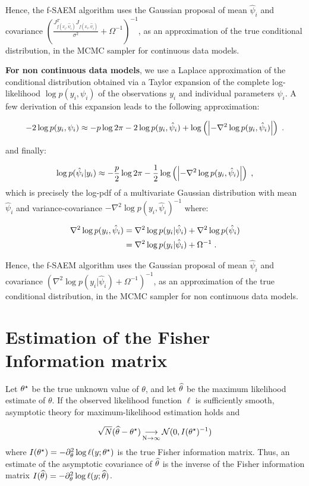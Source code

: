 Hence, the f-SAEM algorithm uses the Gaussian proposal of mean $\hat{\psi}_i$ and covariance $\left(\frac{ J_{f(x_{i},\hat{\psi}_i)}^T J_{f(x_{i},\hat{\psi}_i)} }{\sigma^2} + \Omega^{-1}\right)^{-1}$, as an approximation of the true conditional distribution, in the MCMC sampler for continuous data models.


\textbf{For non continuous data models}, we use a Laplace approximation of the conditional distribution obtained via a Taylor expansion of the complete log-likelihood $\log p(y_i,\psi_i)$ of the observations $y_i$ and individual parameters $\psi_i$.
A few derivation of this expansion leads to the following approximation:

$$
-2\log p(y_i,\psi_i)  \approx -p\log2\pi - 2\log p(y_i,\hat{\psi}_i) + \log \left(\left|-\nabla^2 \log p(y_i,\hat{\psi}_i)\right|\right)\;.
$$

and finally:

 $$
\log p(\hat{\psi}_i|y_i) \approx -\frac{p}{2}\log2\pi  -\frac{1}{2}\log \left(\left|-\nabla^2 \log p(y_i,\hat{\psi}_i) \right|\right)\;,
$$
which is precisely the log-pdf of a multivariate Gaussian distribution with mean $\hat{\psi}_i$ and  variance-covariance $-\nabla^2 \log p(y_i,\hat{\psi}_i)^{-1}$ where:

\begin{align}
\nabla^2 \log p(y_i,\hat{\psi}_i) &= \nabla^2 \log p(y_i|\hat{\psi}_i) + \nabla^2 \log p(\hat{\psi}_i) \\ \notag
&= \nabla^2 \log p(y_i|\hat{\psi}_i) + \Omega^{-1}\;.\notag
\end{align}

Hence, the f-SAEM algorithm uses the Gaussian proposal of mean $\hat{\psi}_i$ and covariance $\left( \nabla^2 \log p(y_i|\hat{\psi}_i) + \Omega^{-1}\right)^{-1}$, as an approximation of the true conditional distribution, in the MCMC sampler for non continuous data models.

\section{Estimation of the Fisher Information matrix} \label{sec_fish} Let ${\theta^\star}$ be the true unknown value of $\theta$, and let ${\widehat{\theta}}$ be the maximum likelihood estimate of $\theta$. If the observed likelihood function $\ell$ is sufficiently smooth, asymptotic theory for maximum-likelihood estimation holds and

\begin{equation}
\sqrt{N}({\widehat{\theta}}-{\theta^\star}) \mathop{\longrightarrow}\limits_{\mathrm{N\to \infty}}^{\mathrm{}} {\mathcal N}(0,I({\theta^\star})^{-1})
\end{equation}
where $I({\theta^\star})=- \partial^2_\theta \log \ell(y;{\theta^\star})$ is the true Fisher information matrix. Thus, an estimate of the asymptotic covariance of ${\widehat{\theta}}$ is the  inverse of the Fisher information matrix $I({\widehat{\theta}})=- \partial^2_\theta \log \ell(y;{\widehat{\theta}})$.

